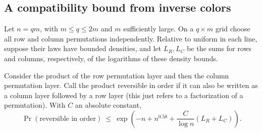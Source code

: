 \subsection{A compatibility bound from inverse colors}
\begin{proposition}\label{tra:inverse-color:compatibility}
\label{tra:inverse-color:compatibility-statement}
Let \(n=qm\), with \(m\le q\le2m\) and \(m\) sufficiently large. On a \(q\times m\) grid choose all row and column permutations independently. Relative to uniform in each line, suppose their laws have bounded densities, and let \(L_R,L_C\) be the sums for rows and columns, respectively, of the logarithms of these density bounds.

Consider the product of the row permutation layer and then the column permutation layer. Call the product reversible in order if it can also be written as a column layer followed by a row layer (this just refers to a factorization of a permutation). With \(C\) an absolute constant,
\begin{equation}
 \Pr(\text{reversible in order})
 \ \le\
 \exp\left(-n+n^{0.58}+\frac{C}{\log n}(L_R+L_C)\right).                         \label{tra:inverse-color:eq1}
\end{equation}
\end{proposition}
